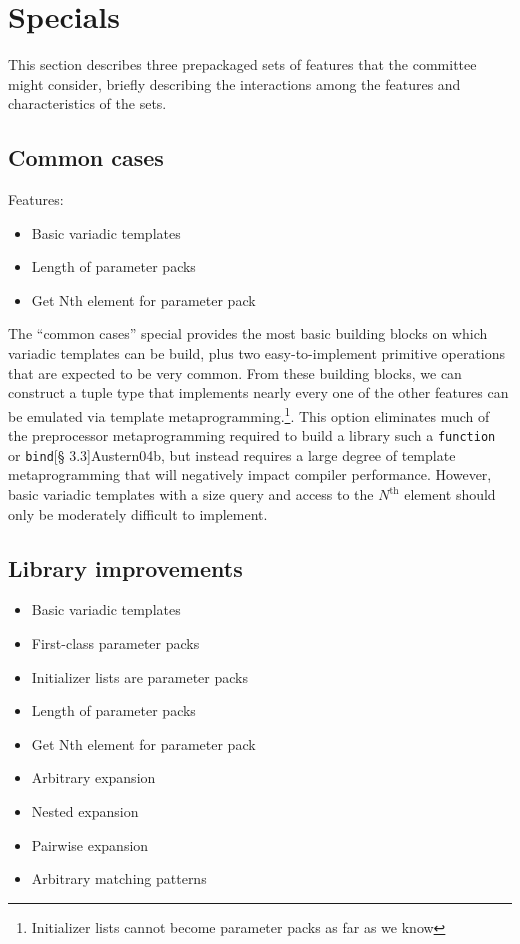 \documentclass{article}
\begin{document}
\section{Specials}
\label{sec:specials}
This section describes three prepackaged sets of features that the
committee might consider, briefly describing the interactions among
the features and characteristics of the sets.

\subsection{Common cases}
Features:
\begin{itemize}
\item Basic variadic templates
\item Length of parameter packs
\item Get Nth element for parameter pack
\end{itemize}

The ``common cases'' special provides the most basic building blocks on
which variadic templates can be build, plus two easy-to-implement
primitive operations that are expected to be very common. From these
building blocks, we can construct a tuple type that implements nearly
every one of the other features can be emulated via template
metaprogramming.\footnote{Initializer lists cannot become parameter
  packs as far as we know}. This option eliminates much of the
preprocessor metaprogramming required to build a library such a
\texttt{function}~\cite[\S 3.4]{Austern04b} or \texttt{bind}[\S
  3.3]{Austern04b}, but instead requires a large degree of template
metaprogramming that will negatively impact compiler
performance. However, basic variadic templates with a size query and
access to the $N^{\text{th}}$ element should only be moderately
difficult to implement.

\subsection{Library improvements}
\begin{itemize}
\item Basic variadic templates
\item First-class parameter packs
\item Initializer lists are parameter packs
\item Length of parameter packs
\item Get Nth element for parameter pack
\item Arbitrary expansion
\item Nested expansion
\item Pairwise expansion
\item Arbitrary matching patterns
\end{itemize}
\end{document}
